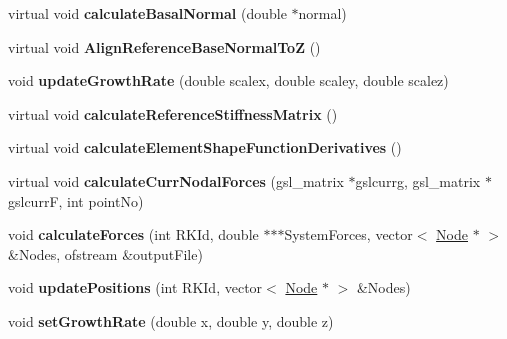 \begin{DoxyCompactItemize}
\item 
\hypertarget{classShapeBase_ae7c003e9b98e31d04275ffb45709c9fa}{}virtual void {\bfseries calculate\+Basal\+Normal} (double $\ast$normal)\label{classShapeBase_ae7c003e9b98e31d04275ffb45709c9fa}

\item 
\hypertarget{classShapeBase_a362a15361e6fd25d65ed05f0cc31737a}{}virtual void {\bfseries Align\+Reference\+Base\+Normal\+To\+Z} ()\label{classShapeBase_a362a15361e6fd25d65ed05f0cc31737a}

\item 
\hypertarget{classShapeBase_ad9ffbae214584cbd0cc1e34f66a8ec5c}{}void {\bfseries update\+Growth\+Rate} (double scalex, double scaley, double scalez)\label{classShapeBase_ad9ffbae214584cbd0cc1e34f66a8ec5c}

\item 
\hypertarget{classShapeBase_a1162e815f80b1b9d58c69df731702ecb}{}virtual void {\bfseries calculate\+Reference\+Stiffness\+Matrix} ()\label{classShapeBase_a1162e815f80b1b9d58c69df731702ecb}

\item 
\hypertarget{classShapeBase_ab86b6c4eef2ea6232dd1d0c300ae5602}{}virtual void {\bfseries calculate\+Element\+Shape\+Function\+Derivatives} ()\label{classShapeBase_ab86b6c4eef2ea6232dd1d0c300ae5602}

\item 
\hypertarget{classShapeBase_afc2e2e90a9352778ba6bf6d547e319bf}{}virtual void {\bfseries calculate\+Curr\+Nodal\+Forces} (gsl\+\_\+matrix $\ast$gslcurrg, gsl\+\_\+matrix $\ast$gslcurr\+F, int point\+No)\label{classShapeBase_afc2e2e90a9352778ba6bf6d547e319bf}

\item 
\hypertarget{classShapeBase_aa5df3f56f90f3026d3732aecf047de70}{}void {\bfseries calculate\+Forces} (int R\+K\+Id, double $\ast$$\ast$$\ast$System\+Forces, vector$<$ \hyperlink{classNode}{Node} $\ast$ $>$ \&Nodes, ofstream \&output\+File)\label{classShapeBase_aa5df3f56f90f3026d3732aecf047de70}

\item 
\hypertarget{classShapeBase_ac323cea68af3b9ca0cfd913222b82e49}{}void {\bfseries update\+Positions} (int R\+K\+Id, vector$<$ \hyperlink{classNode}{Node} $\ast$ $>$ \&Nodes)\label{classShapeBase_ac323cea68af3b9ca0cfd913222b82e49}

\item 
\hypertarget{classShapeBase_ac1ab3fae7adbc8fa015c99fb0d523795}{}void {\bfseries set\+Growth\+Rate} (double x, double y, double z)\label{classShapeBase_ac1ab3fae7adbc8fa015c99fb0d523795}


\end{DoxyCompactItemize}
